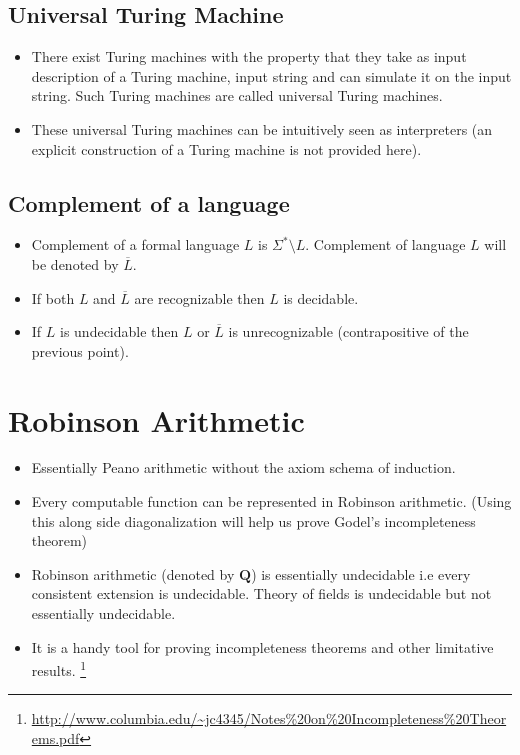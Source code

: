 \documentclass[
11pt,notheorems,hyperref={pdfauthor=whatever}
]{beamer}
\begin{document}
\subsection{Universal Turing Machine}
\begin{frame}
\begin{itemize}
    \setlength\itemsep{3em}
    \item There exist Turing machines with the property that they take as input description of a Turing machine, input string and can simulate it on the input string. Such Turing machines are called universal Turing machines.
    \item These universal Turing machines can be intuitively seen as interpreters (an explicit construction of a Turing machine is not provided here).
\end{itemize}
\end{frame}

\subsection{Complement of a language}
\begin{frame}
\begin{itemize}
    \setlength\itemsep{3em}
    \item Complement of a formal language $L$ is $\Sigma^* \setminus L$. Complement of language $L$ will be denoted by $\overline{L}$.
    \item If both $L$ and $\overline{L}$ are recognizable then $L$ is decidable.
    \item If $L$ is undecidable then $L$ or $\overline{L}$ is unrecognizable (contrapositive of the previous point).
\end{itemize}
\end{frame}

\section{Robinson Arithmetic}
\begin{frame}
\begin{itemize}
    \setlength\itemsep{2em}
    \item Essentially Peano arithmetic without the axiom schema of induction.
    \item Every computable function can be represented in Robinson arithmetic. \cite{odifreddi1992classical} (Using this along side diagonalization will help us prove Godel's incompleteness theorem)
    \item Robinson arithmetic (denoted by $\textbf{Q}$) is essentially undecidable i.e every consistent extension is undecidable. Theory of fields is undecidable but not essentially undecidable.
    \item It is a handy tool for proving incompleteness theorems and other limitative results. \footnote{\url{http://www.columbia.edu/~jc4345/Notes\%20on\%20Incompleteness\%20Theorems.pdf}}
\end{itemize}
\end{frame}
\end{document}
